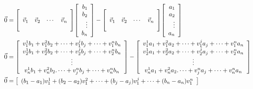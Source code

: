 \documentclass{letter}
\newcommand{\Vn}[1]{\vec{#1}}
\newcommand{\?}{\stackrel{?}{=}}
\newenvironment{Mat}[1]{%
  \left[\begin{array}{*{#1}{r}}
}{%
  \end{array}\right]
}
\newenvironment{Cmat}[1]{%
  \left[\begin{array}{*{#1}{c}}
}{%
  \end{array}\right]
}
\begin{document}
\begin{enumerate}
\begin{enumerate}[label=(\alph*)]
{\begin{align*}
              \Vn{0} &=
              \begin{Mat}{4}          &          &        &         \\
                             \Vn{v}_1 & \Vn{v}_2 & \cdots & \Vn{v}_n \\ 
                                      &          &        &   \end{Mat}
              \begin{Mat}{1} b_1 \\ b_2 \\ \vdots \\ b_n \end{Mat}
              -\begin{Mat}{4}          &          &        &         \\
                             \Vn{v}_1 & \Vn{v}_2 & \cdots & \Vn{v}_n \\ 
                                      &          &        &   \end{Mat}
              \begin{Mat}{1} a_1 \\ a_2 \\ \vdots \\ a_n \end{Mat} \\
              \Vn{0} &= \begin{Cmat}{1} v_1^1b_1+v_1^2b_2+\cdots+v_1^jb_j+\cdots+v_1^nb_n \\
                                        v_2^1b_1+v_2^2b_2+\cdots+v_2^jb_j+\cdots+v_2^nb_n \\
                                        \vdots \\
                                        v_n^1b_1+v_n^2b_2.\cdots+v_j^nb_j+\cdots+v_n^nb_n \end{Cmat}
              -
                        \begin{Cmat}{1} v_1^1a_1+v_1^2a_2+\cdots+v_1^ja_j+\cdots+v_1^na_n \\
                                        v_2^1a_1+v_2^2a_2+\cdots+v_2^ja_j+\cdots+v_2^na_n \\
                                        \vdots \\
                                        v_n^1a_1+v_n^2a_2.\cdots+v_j^na_j+\cdots+v_n^na_n \end{Cmat}  \\       
              \Vn{0} &= \begin{Cmat}{1} (b_1-a_1)v_1^1+(b_2-a_2)v_1^2+\cdots+(b_j-a_j)v_1^j+\cdots+(b_n-a_n)v_1^n \\

\end{Cmat}
\end{align*}}
\end{enumerate}
\end{enumerate}
\end{document}
